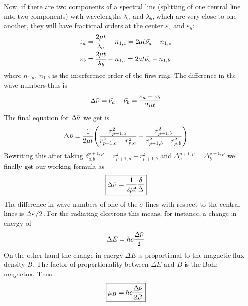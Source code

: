 \documentclass[%
 reprint,
nofootinbib,
 amsmath,amssymb,
 aps,
floatfix,
]{revtex4-2}
\begin{document}
    Now, if there are two components of a spectral line (splitting of one central line into two components) with wavelengths $\lambda_a$ and $\lambda_b$, which are very close to one another, they will have fractional orders at the center $\varepsilon_a$ and $\varepsilon_b$:
    \begin{equation}
        \begin{split}
            \varepsilon_a
            &= \dfrac{2 \mu t}{\lambda_a} - n_{1, a} = 2 \mu t \Bar{\nu_a} - n_{1, a} \\
            \varepsilon_b
            &= \dfrac{2 \mu t}{\lambda_b} - n_{1, b} = 2 \mu t \Bar{\nu_b} - n_{1, b}
        \end{split}
    \end{equation}
    where $n_{1, a}$, $n_{1, b}$ is the interference order of the first ring. The difference in the wave numbers thus is
    \begin{equation}
        \Delta \Bar{\nu} = \Bar{\nu_a} - \Bar{\nu_b} = \dfrac{\varepsilon_a - \varepsilon_b}{2 \mu t}
    \end{equation}
    The final equation for $\Delta \Bar{\nu}$ we get is
    \begin{equation}
        \Delta \Bar{\nu} = \dfrac{1}{2 \mu t} \Bigg( \dfrac{r_{p+1, a}^2}{r_{p+1, a}^2 - r_{p, a}^2} - \dfrac{r_{p+1, b}^2}{r_{p+1, b}^2 - r_{p, b}^2} \Bigg)
    \end{equation}
    Rewriting this after taking $\delta_{a, b}^{p+1, p} = r_{p+1, a}^2 - r_{p+1, b}^2$ and $\Delta_a^{p+1, p} = \Delta_b^{p+1, p}$ we finally get our working formula as
    \begin{equation}
        \boxed{\Delta \Bar{\nu} = \dfrac{1}{2 \mu t} \dfrac{\delta}{\Delta}}
    \end{equation}
    The difference in wave numbers of one of the $\sigma$-lines with respect to the central lines is $\Delta \Bar{\nu}/2$. For the radiating electrons this means, for instance, a change in energy of
    \begin{equation}
        \Delta E = hc \dfrac{\Delta \Bar{\nu}}{2}
    \end{equation}
    On the other hand the change in energy $\Delta E$ is proportional to the magnetic flux density $B$. The factor of proportionality between $\Delta E$ and $B$ is the Bohr magneton. Thus
    \begin{equation}
    \label{eqbohr}
        \boxed{\mu_B = hc \dfrac{\Delta \Bar{\nu}}{2B}}
    \end{equation}
    
\end{document}
